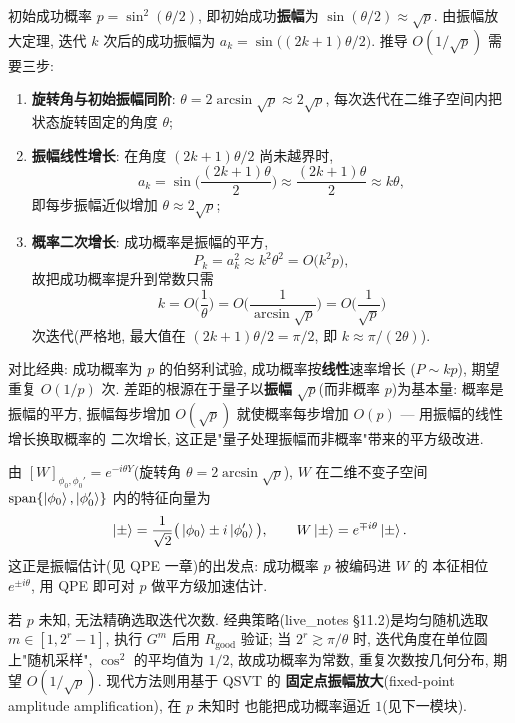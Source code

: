 \documentclass[utf8]{article} %
\numberwithin{equation}{section}   %
\newtheorem{Note}{\hskip 2em {\color{red} 注}}[subsection]
\begin{document}
\begin{Note}
    初始成功概率 $p = \sin^2(\theta/2)$, 即初始成功\textbf{振幅}为
    $\sin(\theta/2) \approx \sqrt{p}$. 由振幅放大定理, 迭代 $k$ 次后的成功振幅为
    $a_k = \sin\big((2k+1)\theta/2\big)$. 推导 $O(1/\sqrt{p})$ 需要三步:
    \begin{enumerate}
        \item \textbf{旋转角与初始振幅同阶}: $\theta = 2\arcsin\sqrt{p} \approx 2\sqrt{p}$,
        每次迭代在二维子空间内把状态旋转固定的角度 $\theta$;
        \item \textbf{振幅线性增长}: 在角度 $(2k+1)\theta/2$ 尚未越界时, 
        \[ a_k = \sin\!\Big(\frac{(2k+1)\theta}{2}\Big) \approx \frac{(2k+1)\theta}{2} \approx k\theta, \]
        即每步振幅近似增加 $\theta \approx 2\sqrt{p}$;
        \item \textbf{概率二次增长}: 成功概率是振幅的平方, 
        \[ P_k = a_k^2 \approx k^2\theta^2 = O\big(k^2 p\big), \]
        故把成功概率提升到常数只需
        \[ k = O\Big(\frac{1}{\theta}\Big) = O\Big(\frac{1}{\arcsin\sqrt{p}}\Big) = O\Big(\frac{1}{\sqrt{p}}\Big) \]
        次迭代(严格地, 最大值在 $(2k+1)\theta/2 = \pi/2$, 即 $k \approx \pi/(2\theta)$).
    \end{enumerate}
    对比经典: 成功概率为 $p$ 的伯努利试验, 成功概率按\textbf{线性}速率增长
    ($P \sim kp$), 期望重复 $O(1/p)$ 次. 差距的根源在于量子以\textbf{振幅}
    $\sqrt{p}$(而非概率 $p$)为基本量: 概率是振幅的平方, 振幅每步增加
    $O(\sqrt{p})$ 就使概率每步增加 $O(p)$ --- 用振幅的线性增长换取概率的
    二次增长, 这正是"量子处理振幅而非概率"带来的平方级改进.
\end{Note}

\begin{Note}[$W$ 的本征结构]
    由 $[W]_{\phi_0,\phi_0'} = e^{-i\theta Y}$(旋转角 $\theta = 2\arcsin\sqrt{p}$),
    $W$ 在二维不变子空间 $\mathrm{span}\{\ket{\phi_0}, \ket{\phi_0'}\}$ 内的特征向量为
    \[ \ket{\pm} = \frac{1}{\sqrt{2}}\big(\ket{\phi_0} \pm i\ket{\phi_0'}\big),
       \qquad W\ket{\pm} = e^{\mp i\theta}\ket{\pm}. \]
    这正是振幅估计(见 QPE 一章)的出发点: 成功概率 $p$ 被编码进 $W$ 的
    本征相位 $e^{\pm i\theta}$, 用 QPE 即可对 $p$ 做平方级加速估计.
\end{Note}

\begin{Note}[$p$ 未知时的策略]
    若 $p$ 未知, 无法精确选取迭代次数. 经典策略(live\_notes §11.2)是均匀随机选取
    $m \in [1, 2^r - 1]$, 执行 $G^m$ 后用 $R_{\mathrm{good}}$ 验证; 当 $2^r \gtrsim \pi/\theta$
    时, 迭代角度在单位圆上"随机采样", $\cos^2$ 的平均值为 $1/2$, 故成功概率为常数, 
    重复次数按几何分布, 期望 $O(1/\sqrt{p})$. 现代方法则用基于 QSVT 的
    \textbf{固定点振幅放大}(fixed-point amplitude amplification), 在 $p$ 未知时
    也能把成功概率逼近 $1$(见下一模块).
\end{Note}
\end{document}
